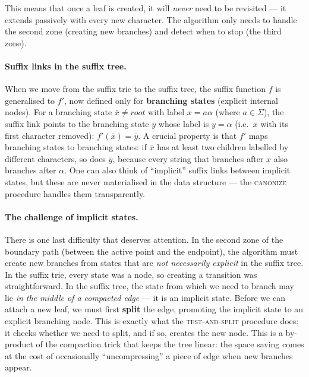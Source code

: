 This means that once a leaf is created, it will \emph{never} need to
be revisited --- it extends passively with every new character.
The algorithm only needs to handle the second zone (creating new
branches) and detect when to stop (the third zone).

\paragraph{Suffix links in the suffix tree.}
When we move from the suffix trie to the suffix tree, the suffix
function $f$ is generalised to $f'$, now defined only for
\textbf{branching states} (explicit internal nodes).
For a branching state $\bar{x} \neq root$ with label $x = a\alpha$
(where $a \in \Sigma$), the suffix link points to the branching state
$\bar{y}$ whose label is $y = \alpha$ (i.e.\ $x$ with its first
character removed): $f'(\bar{x}) = \bar{y}$.
A crucial property is that $f'$ maps branching states to branching
states: if $\bar{x}$ has at least two children labelled by different
characters, so does $\bar{y}$, because every string that branches
after $x$ also branches after $\alpha$.
One can also think of ``implicit'' suffix links between implicit
states, but these are never materialised in the data structure ---
the \textsc{canonize} procedure handles them transparently.


\paragraph{The challenge of implicit states.}
There is one last difficulty that deserves attention.
In the second zone of the boundary path (between the active point and
the endpoint), the algorithm must create new branches from states that
are \emph{not necessarily explicit} in the suffix tree.
In the suffix trie, every state was a node, so creating a transition
was straightforward.
In the suffix tree, the state from which we need to branch may lie
\emph{in the middle of a compacted edge} --- it is an implicit state.
Before we can attach a new leaf, we must first \textbf{split} the edge,
promoting the implicit state to an explicit branching node.
This is exactly what the \textsc{test-and-split} procedure does: it
checks whether we need to split, and if so, creates the new node.
This is a by-product of the compaction trick that keeps the tree linear:
the space saving comes at the cost of occasionally ``uncompressing'' a
piece of edge when new branches appear.

